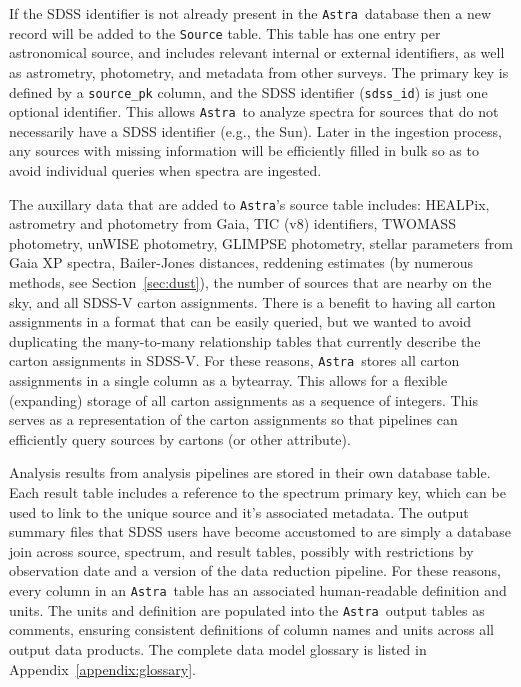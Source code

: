 \documentclass[modern]{aastex631}
\newcommand{\astra}{\texttt{Astra}}
\newcommand{\Astra}{\astra}
\begin{document}
If the SDSS identifier is not already present in the \Astra\ database then a new record will be added to the \texttt{Source} table. This table has one entry per astronomical source, and includes relevant internal or external identifiers, as well as astrometry, photometry, and metadata from other surveys. The primary key is defined by a \texttt{source\_pk} column, and the SDSS identifier (\texttt{sdss\_id}) is just one optional identifier. This allows \Astra\ to analyze spectra for sources that do not necessarily have a SDSS identifier (e.g., the Sun). Later in the ingestion process, any sources with missing information will be efficiently filled in bulk so as to avoid individual queries when spectra are ingested. 

The auxillary data that are added to \Astra's source table includes: HEALPix, astrometry and photometry from Gaia, TIC (v8) identifiers, TWOMASS photometry, unWISE photometry, GLIMPSE photometry, stellar parameters from Gaia XP spectra, Bailer-Jones distances, reddening estimates (by numerous methods, see Section~\ref{sec:dust}), the number of sources that are nearby on the sky, and all SDSS-V carton assignments. There is a benefit to having all carton assignments in a format that can be easily queried, but we wanted to avoid duplicating the many-to-many relationship tables that currently describe the carton assignments in SDSS-V. For these reasons, \Astra\ stores all carton assignments in a single column as a bytearray. This allows for a flexible (expanding) storage of all carton assignments as a sequence of integers. This  serves as a representation of the carton assignments so that pipelines can efficiently query sources by cartons (or other attribute).


Analysis results from analysis pipelines are stored in their own database table. Each result table includes a reference to the spectrum primary key, which can be used to link to the unique source and it's associated metadata. The output summary files that SDSS users have become accustomed to are simply a database join across source, spectrum, and result tables, possibly with restrictions by observation date and a version of the data reduction pipeline. For these reasons, every column in an \Astra\ table has an associated human-readable definition and units. The units and definition are populated into the \Astra\ output tables as comments, ensuring consistent definitions of column names and units across all output data products. The complete data model glossary is listed in Appendix~\ref{appendix:glossary}.
\end{document}
